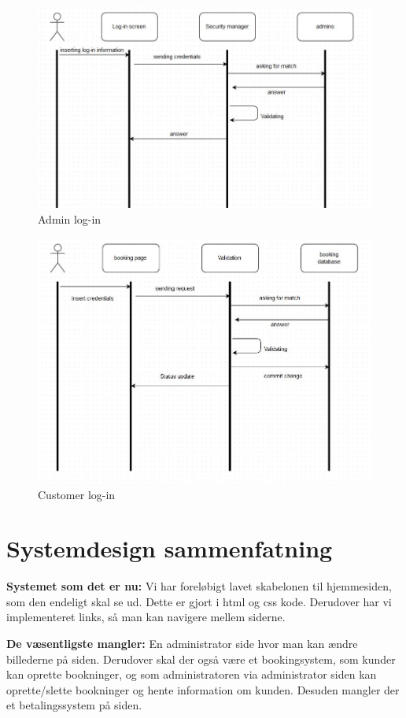 \documentclass[12pt,a4paper]{article}
\begin{document}
\begin{figure}[H]
\includegraphics[scale=0.4]{adminLog-in.jpg}
\caption{Admin log-in}
\end{figure}


\begin{figure}[H]
\includegraphics[scale=0.4]{customerLog-in.jpg}
\caption{Customer log-in}
\end{figure}
\newpage
\section{Systemdesign sammenfatning}
\textbf{Systemet som det er nu:}
Vi har foreløbigt lavet skabelonen til hjemmesiden, som den endeligt skal se ud. Dette er gjort i html og css kode. Derudover har vi implementeret links, så man kan navigere mellem siderne. 

\textbf{De væsentligste mangler:}
En administrator side hvor man kan ændre billederne på siden. 
Derudover skal der også være et bookingsystem, som kunder kan oprette bookninger, og som administratoren via administrator siden kan oprette/slette bookninger og hente information om kunden. Desuden mangler der et betalingssystem på siden.
\newpage
\end{document}
